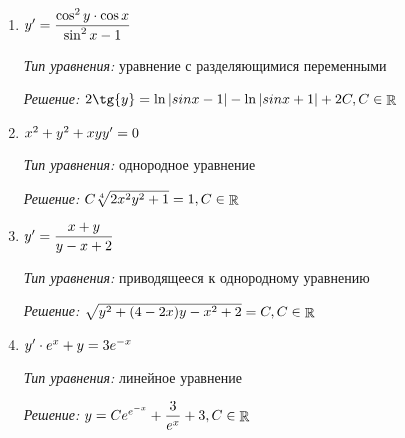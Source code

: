 \begin{enumerate}                                                   
	\item 
		$ {y}' = \dfrac{\cos^{2}{y} \cdot \cos{x}}{\sin^2{x} - 1} $
		
		\textit{Тип уравнения:} уравнение с разделяющимися переменными
		
		\textit{Решение:} 
		$ 2\tg{y} = \ln{|sinx - 1|} - \ln{|sinx + 1|} + 2C, C \in \rational $ 

	\item 
		$ {x}^2 + {y}^2 + xyy' = 0 $
		
		\textit{Тип уравнения:} однородное уравнение
		
		\textit{Решение:}
		$ C\sqrt[4]{{2 x^2 y^2} + 1} = 1, C \in \mathop{\rm \mathbb{R}} $ 
		
	\newpage
		
	\item
		$ {y}' = \dfrac{x + y}{y - x + 2} $
		
		\textit{Тип уравнения:} приводящееся к однородному уравнению
		
		\textit{Решение:}
		$ \sqrt{y^2 + (4 - 2x) y - x^2 + 2} = C, C \in \mathop{\rm \mathbb{R}} $    
		               
	\item
		$ {y}' \cdot e^{x} + {y} = 3e^{-x} $
		
		\textit{Тип уравнения:} линейное уравнение
		
		\textit{Решение:}
		$ y = Ce^{e^{-x}} + \dfrac{3}{e^{x}} + 3, C \in \mathop{\rm \mathbb{R}} $ 
		
\end{enumerate}
